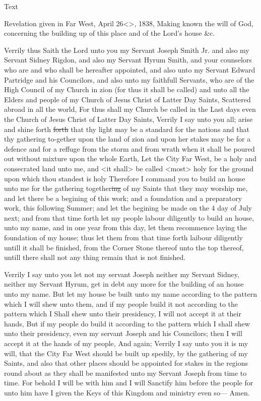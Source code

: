 				\begin{description}
					\item[Text]
				\end{description}
				
					Revelation given in Far West, April 26<>, 1838, Making known the will of God, concerning the building up of this place and of the Lord's house \&c.
					
					Verrily thus Saith the Lord unto you my Servant Joseph Smith Jr. and also my Servant Sidney Rigdon, and also my Servant Hyrum Smith, and your counselors who are and who shall be hereafter appointed, and also unto my Servant Edward Partridge and his Councilors, and also unto my faithfull Servants, who are of the High Council of my Church in zion (for thus it shall be called) and unto all the Elders and people of my Church of Jesus Christ of Latter Day Saints, Scattered abroad in all the world, For thus shall my Church be called in the Last days even the Church of Jesus Christ of Latter Day Saints, Verrily I say unto you all; arise and shine forth \sout{forth} that thy light may be a standard for the nations and that thy gathering to-gether upon the land of zion and upon her stakes may be for a defence and for a reffuge from the storm and from wrath when it shall be poured out without mixture upon the whole Earth, Let the City Far West, be a holy and consecrated land unto me, and <it shall> be called <most> holy for the ground upon which thou standest is holy Therefore I command you to build an house unto me for the gathering together\sout{ing} of my Saints that they may worship me, and let there be a begining of this work; and a foundation and a preparatory work, this following Summer; and let the begining be made on the 4 day of July next; and from that time forth let my people labour diligently to build an house, unto my name, and in one year from this day, let them recommence laying the foundation of my house; thus let them from that time forth laibour diligently untill it shall be finished, from the Corner Stone thereof unto the top thereof, untill there shall not any thing remain that is not finished.
					
					Verrily I say unto you let not my servant Joseph neither my Servant Sidney, neither my Servant Hyrum, get in debt any more for the building of an house unto my name. But let my house be built unto my name according to the pattern which I will shew unto them, and if my people build it not according to the pattern which I Shall shew unto their presidency, I will not accept it at their hands, But if my people do build it according to the pattern which I shall shew unto their presidency, even my servant Joseph and his Councilors; then I will accept it at the hands of my people, And again; Verrily I say unto you it is my will, that the City Far West should be built up spedily, by the gathering of my Saints, and also that other places should be appointed for stakes in the regions round about as they shall be manifested unto my Servant Joseph from time to time. For behold I will be with him and I will Sanctify him before the people for unto him have I given the Keys of this Kingdom and	ministry even so--- Amen.
					
